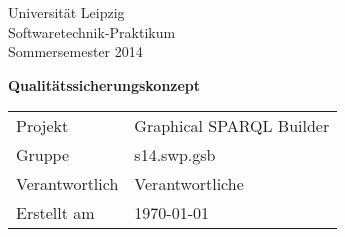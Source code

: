 
\def\verantwortlicher{Verantwortliche} %
\thispagestyle{empty} 

\vspace*{2\baselineskip}

\begin{center}
\sffamily
Universität Leipzig\\
Softwaretechnik-Praktikum\\
Sommersemester 2014
\baselineskip

\bgroup
\Huge\textbf{Qualitätssicherungskonzept}
\egroup
{}\baselineskip

\begin{tabular}{ll}
Projekt & Graphical SPARQL Builder \\
Gruppe & s14.swp.gsb \\
Verantwortlich & \verantwortlicher\\
Erstellt am & \today \\
\end{tabular}
\end{center}

\vfill%

\tableofcontents

\pagebreak